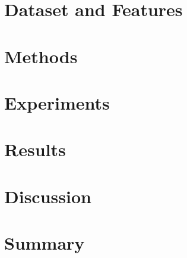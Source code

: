 \documentclass[transmag]{IEEEtran}
\begin{document}
\section{Dataset and Features}

\section{Methods}

\section{Experiments}

\section{Results}

\section{Discussion}

\section{Summary}












\newpage\null\thispagestyle{empty}\newpage
\end{document}
